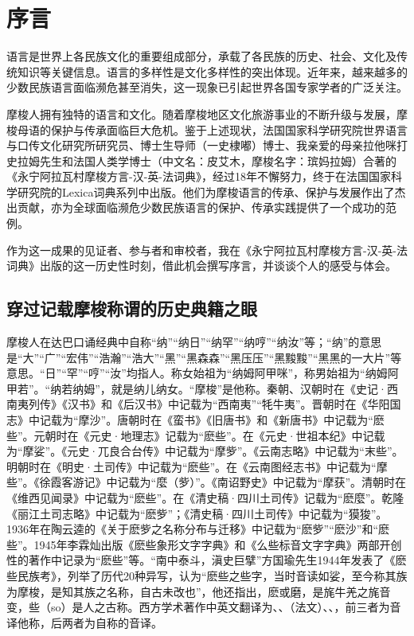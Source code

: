 \languecmncn

\chapter*{序言}

语言是世界上各民族文化的重要组成部分，承载了各民族的历史、社会、文化及传统知识等关键信息。语言的多样性是文化多样性的突出体现。近年来，越来越多的少数民族语言面临濒危甚至消失，这一现象已引起世界各国专家学者的广泛关注。

摩梭人拥有独特的语言和文化。随着摩梭地区文化旅游事业的不断升级与发展，摩梭母语的保护与传承面临巨大危机。鉴于上述现状，法国国家科学研究院世界语言与口传文化研究所研究员、博士生导师（一史棣嘟）博士、我亲爱的母亲拉他咪打史拉姆先生和法国人类学博士（中文名：皮艾木，摩梭名字：瑸妈拉姆）合著的《永宁阿拉瓦村摩梭方言-汉-英-法词典》，经过18年不懈努力，终于在法国国家科学研究院的Lexica词典系列中出版。他们为摩梭语言的传承、保护与发展作出了杰出贡献，亦为全球面临濒危少数民族语言的保护、传承实践提供了一个成功的范例。

作为这一成果的见证者、参与者和审校者，我在《永宁阿拉瓦村摩梭方言-汉-英-法词典》出版的这一历史性时刻，借此机会撰写序言，并谈谈个人的感受与体会。

\section*{穿过记载摩梭称谓的历史典籍之眼}

摩梭人在达巴口诵经典中自称“纳”“纳日”“纳罕”“纳哼”“纳汝”等；“纳”的意思是“大”“广”“宏伟”“浩瀚”“浩大”“黑”“黑森森”“黑压压”“黑黢黢”“黑黑的一大片”等意思。“日”“罕”“哼”“汝”均指人。称女始祖为“纳姆阿甲咪”，称男始祖为“纳姆阿甲若”。“纳若纳姆”，就是纳儿纳女。“摩梭”是他称。秦朝、汉朝时在《史记·西南夷列传》《汉书》和《后汉书》中记载为“西南夷”“牦牛夷”。晋朝时在《华阳国志》中记载为“摩沙”。唐朝时在《蛮书》《旧唐书》和《新唐书》中记载为“麽些”。元朝时在《元史·地理志》记载为“麽些”。在《元史·世祖本纪》中记载为“摩娑”。《元史·兀良合台传》中记载为“摩㱔”。《云南志略》中记载为“末些”。明朝时在《明史·土司传》中记载为“麽些”。在《云南图经志书》中记载为“摩些”。《徐霞客游记》中记载为“麼（㱔）”。《南诏野史》中记载为“摩获”。清朝时在《维西见闻录》中记载为“麽些”。在《清史稿·四川土司传》记载为“麽麼”。乾隆《丽江土司志略》中记载为“麽㱔”；《清史稿·四川土司传》中记载为“獏狻”。1936年在陶云逵的《关于麽㱔之名称分布与迁移》中记载为“麽㱔”“麽沙”和“麽些”。1945年李霖灿出版《麽些象形文字字典》和《么些标音文字字典》两部开创性的著作中记录为“麽些”等。“南中泰斗，滇史巨擘”方国瑜先生1944年发表了《麽些民族考》，列举了历代20种异写，认为“麽些之些字，当时音读如娑，至今称其族为摩梭，是知其族之名称，自古未改也”，他还指出，麽或磨，是旄牛羌之旄音变，些（so）是人之古称。西方学术著作中英文翻译为、、（法文）、、，前三者为音译他称，后两者为自称的音译。

